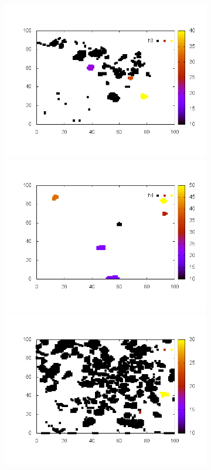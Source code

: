 \documentclass[10pt,a4paper]{article}
\begin{document}
\begin{figure}
\begin{subfigure}[b]{1\textwidth}
\end{subfigure}

\begin{subfigure}[b]{1\textwidth}
\includegraphics[scale=.3]{./img/stampe/scc1/3.png}
\includegraphics[scale=.3]{./img/stampe/scc1/4.png}
\includegraphics[scale=.3]{./img/stampe/scc1/5.png}
\end{subfigure}


\end{figure}
\end{document}
